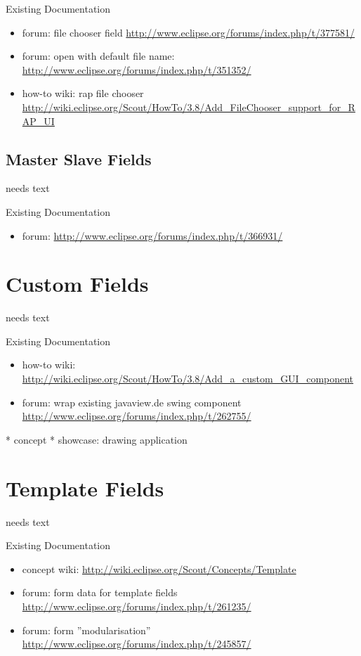 \documentclass[a4paper,10pt,twoside]{book}
\begin{document}
\noindent Existing Documentation
\begin{itemize}
  \item forum: file chooser field \url{http://www.eclipse.org/forums/index.php/t/377581/}
  \item forum: open with default file name: \url{http://www.eclipse.org/forums/index.php/t/351352/}
  \item how-to wiki: rap file chooser \url {http://wiki.eclipse.org/Scout/HowTo/3.8/Add_FileChooser_support_for_RAP_UI}
\end{itemize}

\section{Master Slave Fields}
needs text

\noindent Existing Documentation
\begin{itemize}
  \item forum: \url{http://www.eclipse.org/forums/index.php/t/366931/}
\end{itemize}

\chapter{Custom Fields}

needs text

\noindent Existing Documentation
\begin{itemize}
  \item how-to wiki: \url{http://wiki.eclipse.org/Scout/HowTo/3.8/Add_a_custom_GUI_component}
  \item forum: wrap existing javaview.de swing component \url{http://www.eclipse.org/forums/index.php/t/262755/}
\end{itemize}

  * concept
  * showcase: drawing application

\chapter{Template Fields}
needs text

\noindent Existing Documentation
\begin{itemize}
  \item concept wiki: \url{http://wiki.eclipse.org/Scout/Concepts/Template}
  \item forum: form data for template fields \url{http://www.eclipse.org/forums/index.php/t/261235/}
  \item forum: form ''modularisation'' \url{http://www.eclipse.org/forums/index.php/t/245857/}
\end{itemize}
\end{document}
